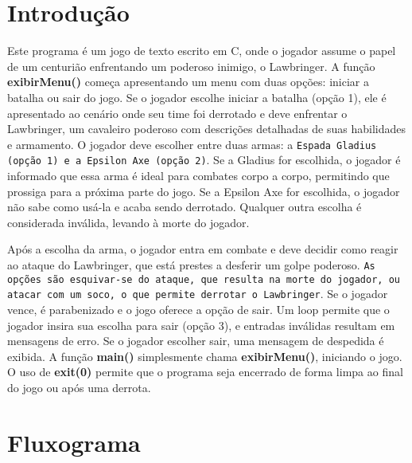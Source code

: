 \documentclass[a4paper,12pt]{article} %
\begin{document}
\section{Introdução}


Este programa é um jogo de texto escrito em C, onde o jogador assume o papel de um centurião enfrentando um poderoso inimigo, o Lawbringer. A função \textbf{exibirMenu()} começa apresentando um menu com duas opções: iniciar a batalha ou sair do jogo. Se o jogador escolhe iniciar a batalha (opção 1), ele é apresentado ao cenário onde seu time foi derrotado e deve enfrentar o Lawbringer, um cavaleiro poderoso com descrições detalhadas de suas habilidades e armamento. O jogador deve escolher entre duas armas: a \texttt{Espada Gladius (opção 1) e a Epsilon Axe (opção 2)}. Se a Gladius for escolhida, o jogador é informado que essa arma é ideal para combates corpo a corpo, permitindo que prossiga para a próxima parte do jogo. Se a Epsilon Axe for escolhida, o jogador não sabe como usá-la e acaba sendo derrotado. Qualquer outra escolha é considerada inválida, levando à morte do jogador.

Após a escolha da arma, o jogador entra em combate e deve decidir como reagir ao ataque do Lawbringer, que está prestes a desferir um golpe poderoso. \texttt{As opções são esquivar-se do ataque, que resulta na morte do jogador, ou atacar com um soco, o que permite derrotar o Lawbringer}. Se o jogador vence, é parabenizado e o jogo oferece a opção de sair. Um loop permite que o jogador insira sua escolha para sair (opção 3), e entradas inválidas resultam em mensagens de erro. Se o jogador escolher sair, uma mensagem de despedida é exibida. A função \textbf{main()} simplesmente chama \textbf{exibirMenu()}, iniciando o jogo. O uso de \textbf{exit(0)} permite que o programa seja encerrado de forma limpa ao final do jogo ou após uma derrota.

\section{Fluxograma}
\end{document}
